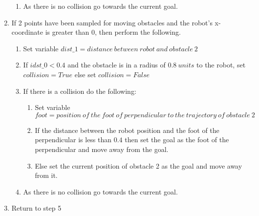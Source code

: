 \documentclass[12pt]{article}
\begin{document}
\begin{enumerate}
\begin{enumerate}
			\item As there is no collision go towards the current goal.
		\end{enumerate}
		\item If 2 points have been sampled for moving obstacles and the robot's x-coordinate is greater than $0$, then perform the following.
		\begin{enumerate}
			\item Set variable $dist\_1 = distance\ between\ robot\ and\ obstacle\ 2$
			\item If $idst\_0 < 0.4$ and the obstacle is in a radius of $0.8\ units$ to the robot, set $collision = True$ else set $collision = False$
			\item If there is a collision do the following:
			\begin{enumerate}
				\item Set variable $foot = position\ of\ the\ foot\ of\ perpendicular\ to\ the\ trajectory\ of\ obstacle\ 2$
				\item If the distance between the robot position and the foot of the perpendicular is less than $0.4$ then set the goal as the foot of the perpendicular and move away from the goal.
				\item Else set the current position of obstacle 2 as the goal and move away from it.
			\end{enumerate}
			\item As there is no collision go towards the current goal.
		\end{enumerate}
		\item Return to step 5
	\end{enumerate}
	
\end{document}

